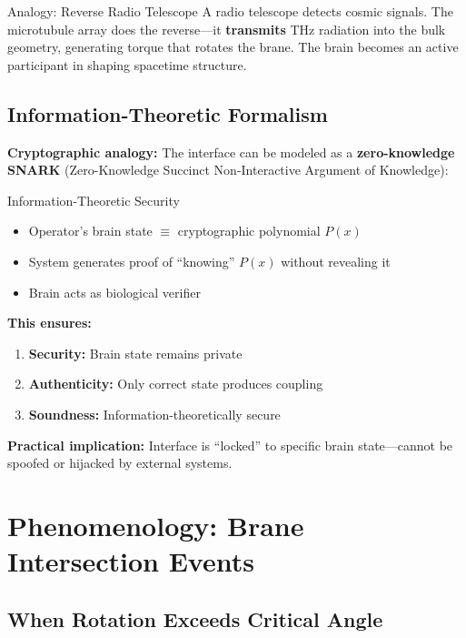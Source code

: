 \begin{calloutbox}{Analogy: Reverse Radio Telescope}
A radio telescope detects cosmic signals. The microtubule array does the reverse---it \textbf{transmits} THz radiation into the bulk geometry, generating torque that rotates the brane. The brain becomes an active participant in shaping spacetime structure.
\end{calloutbox}

\subsection{Information-Theoretic Formalism}
\label{subsec:info-theoretic}

\textbf{Cryptographic analogy:} The interface can be modeled as a \textbf{zero-knowledge SNARK} (Zero-Knowledge Succinct Non-Interactive Argument of Knowledge):

\begin{calloutbox}{Information-Theoretic Security}
\begin{itemize}
\item Operator's brain state $\equiv$ cryptographic polynomial $P(x)$
\item System generates proof of ``knowing'' $P(x)$ without revealing it
\item Brain acts as biological verifier
\end{itemize}

\textbf{This ensures:}
\begin{enumerate}
\item \textbf{Security:} Brain state remains private
\item \textbf{Authenticity:} Only correct state produces coupling
\item \textbf{Soundness:} Information-theoretically secure
\end{enumerate}
\end{calloutbox}

\textbf{Practical implication:} Interface is ``locked'' to specific brain state---cannot be spoofed or hijacked by external systems.

\section{Phenomenology: Brane Intersection Events}
\label{sec:phenomenology}

\subsection{When Rotation Exceeds Critical Angle}
\label{subsec:critical-angle}

